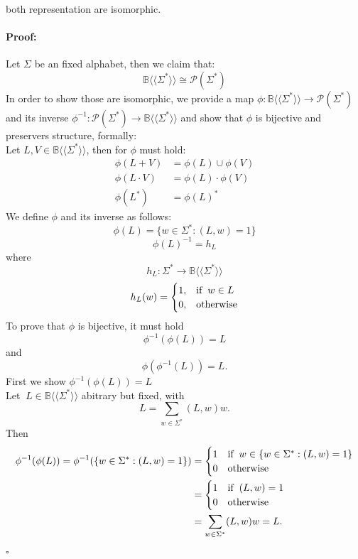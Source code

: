 \documentclass[12pt,letterpaper]{article}
\newenvironment{proof}{\paragraph{Proof:}}{\hfill$\square$}
\newcommand{\fps}[1] {
\mathbb{#1}\langle \langle \Sigma^* \rangle \rangle
}
\begin{document}
both representation are isomorphic.
\begin{proof}
  Let $\Sigma$ be an fixed alphabet, then we claim that:
  \[
    \mathbb{B}\langle \langle \Sigma^* \rangle \rangle
    \cong \mathcal{P}(\Sigma^*)\]
  In order to show those are isomorphic, we provide a map $\phi: 
  \mathbb{B}\langle \langle \Sigma^* \rangle \rangle \to \mathcal{P}(\Sigma^*)$ 
  and its inverse $\phi^{-1}: \mathcal{P}(\Sigma^*) \to \fps{B}$ and
  show that $\phi$ is bijective and preservers structure, formally:\\
  Let $L,V \in \fps{B}$, then for $\phi$ must hold:
  \begin{align}
    \phi(L + V) &= \phi(L) \cup \phi(V) \\
    \phi(L \cdot V) &= \phi(L) \cdot \phi(V)\\
    \phi(L^*) &= \phi(L)^*
  \end{align}
  We define $\phi$ and its inverse as follows:
  \[ 
    \phi(L) = \{ w \in \Sigma^* : (L,w) = 1\}
  \]
  \[
    \phi(L)^{-1} = h_{L}
  \]
  where
  \[ h_L: \Sigma^* \to \fps{B}\]
  \[
    h_L(w) = 
    \begin{cases}
      1, & \text{if} \hspace{0.2cm} w \in L \\
      0, & \text{otherwise}
    \end{cases}
  \]
  To prove that $\phi$ is bijective, it must hold
    \[ 
      \phi^{-1}(\phi(L)) = L
    \]
    and 
    \[
      \phi(\phi^{-1}(L)) = L.
    \]
    First we show $\phi^{-1}(\phi(L)) = L$\\
    Let $\ L \in \fps{B}$ abitrary but fixed, with 
    \[ L =\sum_{w \in \Sigma^*} (L,w)w. \]
    Then
    \begin{align*}
      \phi^{-1}(\phi(L)) = \phi^{-1}(\{ w \in \Sigma^* : (L,w) =1 \})
       &= 
       \begin{cases}
        1 & \text{if} \hspace{0.2cm} w \in \{ w \in \Sigma^* : (L,w) =1 \}\\
        0 & \text{otherwise}
       \end{cases}\\
       &= 
       \begin{cases}
        1 & \text{if} \hspace{0.2cm} (L,w) = 1\\
        0 & \text{otherwise}
       \end{cases}\\
       &= 
       \sum_{w \in \Sigma^*} (L,w)w = L.

\end{align*}
\end{proof}
\end{document}
